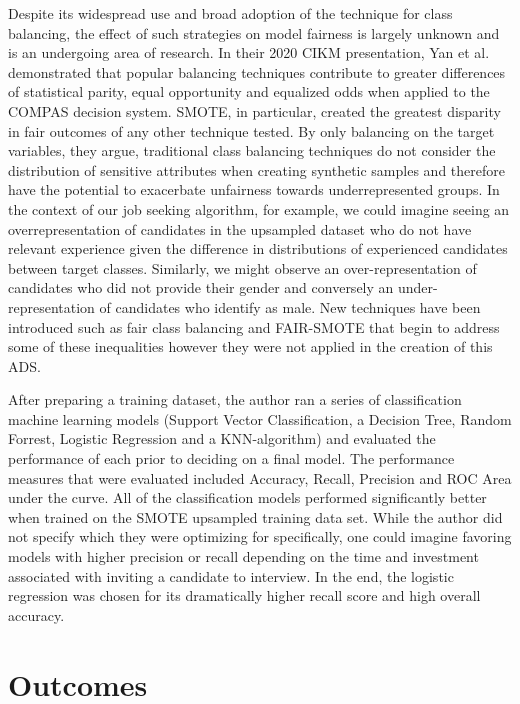 Despite its widespread use and broad adoption of the technique for class balancing, the effect of such strategies on model fairness is largely unknown and is an undergoing area of research. In their 2020 CIKM presentation, Yan et al. demonstrated that popular balancing techniques contribute to greater differences of statistical parity, equal opportunity and equalized odds when applied to the COMPAS decision system. SMOTE, in particular, created the greatest disparity in fair outcomes of any other technique tested. By only balancing on the target variables, they argue, traditional class balancing techniques do not consider the distribution of sensitive attributes when creating synthetic samples and therefore have the potential to exacerbate unfairness towards underrepresented groups. In the context of our job seeking algorithm, for example, we could imagine seeing an over\-representation of candidates in the upsampled dataset who do not have relevant experience given the difference in distributions of experienced candidates between target classes. Similarly, we might observe an over-representation of candidates who did not provide their gender and conversely an under-representation of candidates who identify as male.  New techniques have been introduced such as 
fair class balancing and FAIR-SMOTE that begin to address some of these inequalities however they were not applied in the creation of this ADS.

After preparing a training dataset, the author ran a series of classification machine learning models (Support Vector Classification, a Decision Tree, Random Forrest, Logistic Regression and a KNN-algorithm) and evaluated the performance of each prior to deciding on a final model.  The 
performance measures that were evaluated included Accuracy, Recall, Precision and ROC Area under the curve. All of the classification models performed significantly better when trained on the SMOTE upsampled training data set.  While the author did not specify which they were optimizing for specifically, one could imagine favoring models with higher precision or recall depending on the time and investment associated with inviting a candidate to interview.  In the end, the logistic regression was chosen for its dramatically higher recall score and high overall accuracy.


\pagebreak

\section{Outcomes}

